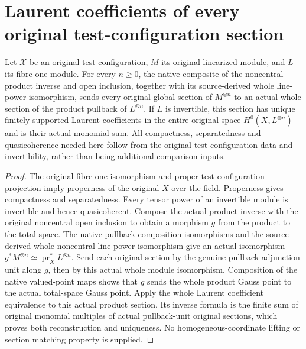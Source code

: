 \section{Laurent coefficients of every original test-configuration section}

\begin{theorem}\label{thm:native-tc-global-laurent-sections}
\leanok
Let $\mathcal X$ be an original test configuration, $M$ its original
linearized module, and $L$ its fibre-one module. For every $n\geq0$,
the native composite of the noncentral product inverse and open inclusion,
together with its source-derived whole line-power isomorphism, sends every original global section of $M^{\otimes n}$
to an actual whole section of the product pullback of $L^{\otimes n}$.
If $L$ is invertible, this section has unique finitely supported
Laurent coefficients in the entire original space
$H^0(X,L^{\otimes n})$ and is their actual monomial sum. All compactness,
separatedness and quasicoherence needed here follow from the original
test-configuration data and invertibility, rather than being additional
comparison inputs.
\end{theorem}
\begin{proof}
The original fibre-one isomorphism and proper test-configuration
projection imply properness of the original $X$ over the field.
Properness gives compactness and separatedness. Every tensor power
of an invertible module is invertible and hence quasicoherent.
Compose the actual product inverse with the original noncentral open
inclusion to obtain a morphism $g$ from the product to the total space.
The native pullback-composition isomorphisms and the source-derived
whole noncentral line-power isomorphism give an actual isomorphism
$g^*M^{\otimes n}\simeq\operatorname{pr}_X^*L^{\otimes n}$.
Send each original section by the genuine pullback-adjunction unit
along $g$, then by this actual whole module isomorphism. Composition
of the native valued-point maps shows that $g$ sends the whole
product Gauss point to the actual total-space Gauss point. Apply the whole Laurent
coefficient equivalence to this actual product section. Its inverse
formula is the finite sum of original monomial multiples of actual
pullback-unit original sections, which proves both reconstruction
and uniqueness. No homogeneous-coordinate lifting or section
matching property is supplied.
\end{proof}

